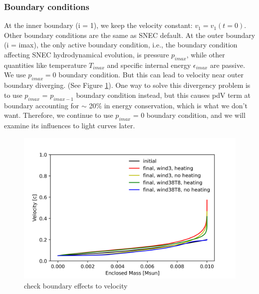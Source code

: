 \documentclass[fleqn,usenatbib]{mnras}
\begin{document}
    
   \subsubsection{Boundary conditions}
 
   At the inner boundary (i = 1), we keep the velocity constant: $v_1 = v_1(t=0)$. Other boundary conditions are the same as SNEC default. At the outer boundary (i = imax), the only active boundary condition, i.e., the boundary condition affecting SNEC hydrodynamical evolution, is pressure $p_{imax}$, while other quantities like temperature $T_{imax}$ and specific internal energy $\epsilon_{imax}$ are passive. We use $p_{imax} = 0$ boundary condition. But this can lead to velocity near outer boundary diverging. (See Figure \ref{boundary_velocity}). One way to solve this divergency problem is to use $p_{imax}$ = $p_{imax-1}$ boundary condition instead, but this causes pdV term at boundary accounting for $\sim$ 20\% in energy conservation, which is what we don't want. Therefore, we continue to use $p_{imax}$ = 0 boundary condition, and we will examine its influences to light curves later.    
   
    \begin{figure}
    \centering
    \includegraphics[scale=0.5]{figures/boundary/outer_boundary_velocity}
    \caption{check boundary effects to velocity}
    \label{boundary_velocity}
    \end{figure}    
\end{document}
